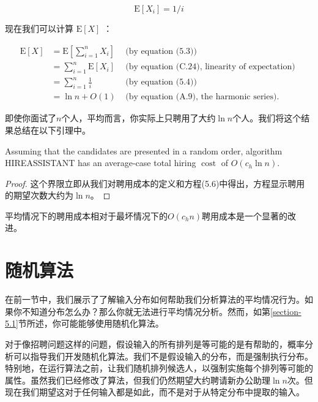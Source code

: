 \documentclass[lang=cn,newtx,10pt,scheme=chinese]{elegantbook}
\begin{document}
$$
\mathrm{E}\left[X_i\right]=1 / i
$$

现在我们可以计算 $\mathrm{E}[X]$ ：

$$
\begin{array}{rlr}
\mathrm{E}[X] & =\mathrm{E}\left[\sum_{i=1}^n X_i\right] & \text { (by equation (5.3)) } \\
& =\sum_{i=1}^n \mathrm{E}\left[X_i\right] & \text { (by equation (C.24), linearity of expectation) } \\
& =\sum_{i=1}^n \frac{1}{i} & \text { (by equation (5.4)) } \\
& =\ln n+O(1) & \text { (by equation (A.9), the harmonic series). }
\end{array}
$$

即使你面试了$n$个人，平均而言，你实际上只聘用了大约$\ln n$个人。我们将这个结果总结在以下引理中。

\begin{lemma}{}{}
Assuming that the candidates are presented in a random order, algorithm HIREASSISTANT has an average-case total hiring $\operatorname{cost}$ of $O\left(c_h \ln n\right)$.
\end{lemma}

\begin{proof}
这个界限立即从我们对聘用成本的定义和方程(5.6)中得出，方程显示聘用的期望次数大约为$\ln n$。
\end{proof}

平均情况下的聘用成本相对于最坏情况下的$O\left(c_h n\right)$聘用成本是一个显著的改进。

\section{随机算法}\label{section-5.3}

在前一节中，我们展示了了解输入分布如何帮助我们分析算法的平均情况行为。如果你不知道分布怎么办？那么你就无法进行平均情况分析。然而，如第\ref{section-5.1}节所述，你可能能够使用随机化算法。

对于像招聘问题这样的问题，假设输入的所有排列是等可能的是有帮助的，概率分析可以指导我们开发随机化算法。我们不是假设输入的分布，而是强制执行分布。特别地，在运行算法之前，让我们随机排列候选人，以强制实施每个排列等可能的属性。虽然我们已经修改了算法，但我们仍然期望大约聘请新办公助理$\ln n$次。但现在我们期望这对于任何输入都是如此，而不是对于从特定分布中提取的输入。
\end{document}
